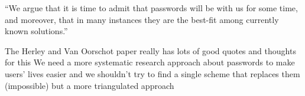``We argue that it is time to admit that passwords will be with us for some time, and moreover, that in many instances they are the best-fit among currently known solutions.'' \cite{Herley2012PersistenceOfPasswords} 

The Herley and Van Oorschot paper really has lots of good quotes and thoughts for this
We need a more systematic research approach about passwords to make users' lives easier and we shouldn't try to find a single scheme that replaces them (impossible) but a more triangulated approach \cite{Herley2012PersistenceOfPasswords}


\cite{Kirlappos2012SecurityEducation,Loutfi2015PasswordsOtherSideOfTheFence,DeAngeli2005PictureThousandWords,Florencio2013WhereDoAllTheAttacksGo,Herley2008ProfitlessEndeavor,Sasse2015,Dittrich2009,Herley2009SoLongThanksExternalities,Vantaggiato2015WeStillNeedPasswords,Florencio2010WhereDoPoliciesComeFrom,Schrittwieser2013,Bonneau2015ImperfectAuthentication,Cyber2014,Florencio2007DoStrongWebPasswords,Sasse2005UsableSecurityPosition,Aebischer2017PicoInTheWild,Forget2007HelpingUsers,Herley2009IfWereSoSmart,Acar2016NotYourDeveloper,Sasse2016,Renaud2009VisualSnakeOil}

